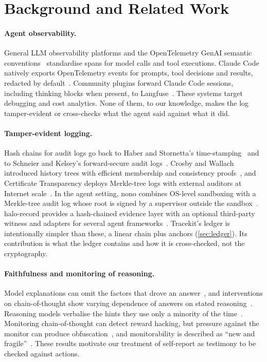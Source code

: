 \documentclass[11pt]{article}
\begin{document}
\section{Background and Related Work}\label{sec:related}
\paragraph{Agent observability.} General LLM observability platforms and the OpenTelemetry GenAI semantic conventions~\cite{otel_genai} standardise spans for model calls and tool executions. Claude Code natively exports OpenTelemetry events for prompts, tool decisions and results, redacted by default~\cite{claudecode_hooks}. Community plugins forward Claude Code sessions, including thinking blocks when present, to Langfuse~\cite{langfuse_cc}. These systems target debugging and cost analytics. None of them, to our knowledge, makes the log tamper-evident or cross-checks what the agent said against what it did.

\paragraph{Tamper-evident logging.} Hash chains for audit logs go back to Haber and Stornetta's time-stamping~\cite{haber1991timestamp} and to Schneier and Kelsey's forward-secure audit logs~\cite{schneier1999secure}. Crosby and Wallach introduced history trees with efficient membership and consistency proofs~\cite{crosby2009tamper}, and Certificate Transparency deploys Merkle-tree logs with external auditors at Internet scale~\cite{rfc9162}. In the agent setting, nono combines OS-level sandboxing with a Merkle-tree audit log whose root is signed by a supervisor outside the sandbox~\cite{nono}. halo-record provides a hash-chained evidence layer with an optional third-party witness and adapters for several agent frameworks~\cite{halorecord}. Tracekit's ledger is intentionally simpler than these, a linear chain plus anchors (\cref{sec:ledger}). Its contribution is what the ledger contains and how it is cross-checked, not the cryptography.

\paragraph{Faithfulness and monitoring of reasoning.} Model explanations can omit the factors that drove an answer~\cite{turpin2023unfaithful}, and interventions on chain-of-thought show varying dependence of answers on stated reasoning~\cite{lanham2023faithfulness}. Reasoning models verbalise the hints they use only a minority of the time~\cite{chen2025reasoning}. Monitoring chain-of-thought can detect reward hacking, but pressure against the monitor can produce obfuscation~\cite{baker2025monitoring}, and monitorability is described as ``new and fragile''~\cite{korbak2025cot}. These results motivate our treatment of self-report as testimony to be checked against actions.
\end{document}
